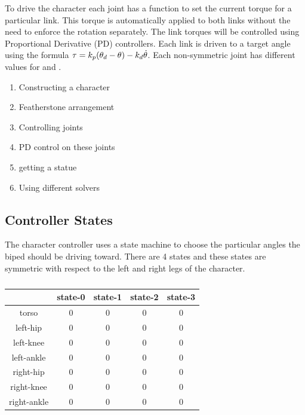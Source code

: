 To drive the character each joint has a function to set the current torque for a particular link. 
This torque is automatically applied to both links without the need to enforce the rotation separately.
The link torques will be controlled using Proportional Derivative (PD) controllers.
Each link is driven to a target angle using the formula $\tau = k_{p}(\theta_{d}- \theta) - k_{d}\dot{\theta} $.
Each non-symmetric joint has different values for \Kp and \Kd.


\begin{enumerate}
	\item Constructing a character
	\item Featherstone arrangement
	\item Controlling joints
	\item PD control on these joints
	\item getting a statue
	\item Using different solvers	
\end{enumerate}


\subsection{Controller States}

The character controller uses a state machine to choose the particular angles the biped should be driving toward. 
There are 4 states and these states are symmetric with respect to the left and right legs of the character.

\begin{table}
\centering
	\begin{tabular}{ c | c | c | c | c }
		            & state-0 & state-1 & state-2 & state-3 \\ \hline
         torso      &    0    &    0    &    0    & 0       \\
		 left-hip   &    0    &    0    &    0    & 0       \\
		 left-knee  &    0    &    0    &    0    & 0       \\
		left-ankle  &    0    &    0    &    0    & 0       \\
		 right-hip  &    0    &    0    &    0    & 0       \\
		right-knee  &    0    &    0    &    0    & 0       \\
		right-ankle &    0    &    0    &    0    & 0
	\end{tabular}
	\caption{\label{table:controler-values}}
\end{table}

